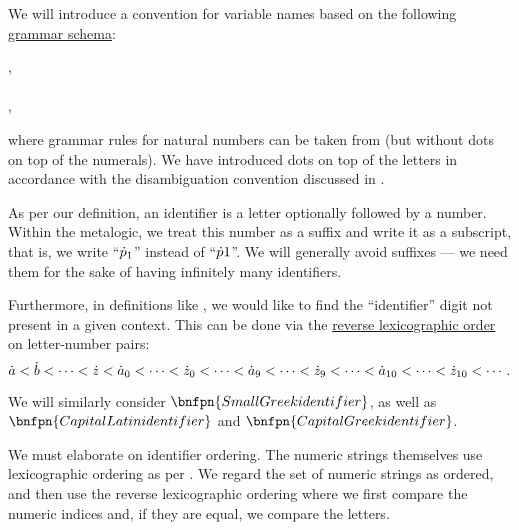 \begin{definition}\label{def:variable_identifier}\mimprovised
  We will introduce a convention for variable names based on the following \hyperref[def:formal_grammar/schema]{grammar schema}:
  \begin{bnf*}
         {\bnftsq{\( \syna \)} \bnfor \bnftsq{\( \synb \)} \bnfor \cdots \bnfor {} \bnfor {}}, \\
     { \bnfor} \\
    , \\
  \end{bnf*}
  where grammar rules for natural numbers can be taken from  (but without dots on top of the numerals). We have introduced dots on top of the letters in accordance with the disambiguation convention discussed in .

  As per our definition, an identifier is a letter optionally followed by a number. Within the metalogic, we treat this number as a suffix and write it as a subscript, that is, we write \enquote{\( {\dot{p}}_1 \)} instead of \enquote{\( {\dot{p}}1 \)}. We will generally avoid suffixes --- we need them for the sake of having infinitely many identifiers.

  Furthermore, in definitions like , we would like to find the \enquote{identifier} digit not present in a given context. This can be done via the \hyperref[thm:def:well_ordered_set/lexicographic]{reverse lexicographic order} on letter-number pairs:
  \begin{equation*}
    {\dot{a}} < {\dot{b}} < \cdots < \dot{z} < {\dot{a}}_0 < \cdots < \dot{z}_0 < \cdots < {\dot{a}}_9 < \cdots < \dot{z}_9 < \cdots < {\dot{a}}_{10} < \cdots < \dot{z}_{10} < \cdots.
  \end{equation*}

  We will similarly consider \( \bnfpn{Small Greek identifier} \), as well as \( \bnfpn{Capital Latin identifier} \) and \( \bnfpn{Capital Greek identifier} \).
\end{definition}
\begin{comments}
  \item We must elaborate on identifier ordering. The numeric strings themselves use lexicographic ordering as per . We regard the set of numeric strings as ordered, and then use the reverse lexicographic ordering where we first compare the numeric indices and, if they are equal, we compare the letters.
\end{comments}

